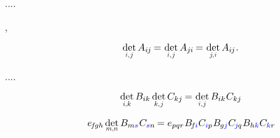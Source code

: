 ....

,

\nopagebreak\vspace{-0.25em}
\begin{equation*}
\determinantby{i}{\hspace{.15ex}j} \, A_{i\hspace{-0.1ex}j} \hspace{-0.16ex}
= \hspace{.1ex} \determinantby{i}{\hspace{.15ex}j} \, A_{j\hspace{-0.06ex}i} \hspace{-0.16ex}
= \hspace{.1ex} \determinantby{j\hspace{-0.2ex}}{\hspace{.1ex}i} \, A_{i\hspace{-0.1ex}j}
\hspace{.1ex} .
\end{equation*}

....


\nopagebreak\vspace{-0.2em}
\begin{equation}\label{determinantofmatrixproduct}
\determinantby{i}{k} \, \somematrixelements{ik} \hspace{.4ex} \determinantby{k}{\hspace{.15ex}j} \, C_{kj} \hspace{-0.15ex}
= \hspace{.1ex} \determinantby{i}{\hspace{.15ex}j} \, \somematrixelements{ik} \hspace{.1ex} C_{kj}
\end{equation}

\[
e_{\hspace{-0.25ex}f\hspace{-0.2ex}gh} \hspace{.33ex} \determinantby{m}{n} \, \somematrixelements{m\mathcolor{blue}{s}} \hspace{.1ex} C_{\mathcolor{blue}{s}n} \hspace{-0.2ex}
= e_{pqr} \hspace{.1ex} \somematrixelements{\hspace{-0.25ex}f\hspace{-0.1ex}\mathcolor{blue}{i}} C_{\mathcolor{blue}{i}p} \hspace{.1ex} \somematrixelements{\hspace{-0.1ex}g\mathcolor{blue}{j}} C_{\hspace{-0.1ex}\mathcolor{blue}{j}\hspace{-0.1ex}q} \hspace{.1ex} \somematrixelements{h\mathcolor{blue}{k}} C_{\mathcolor{blue}{k}r}
\hspace{-0.2ex}
\]


